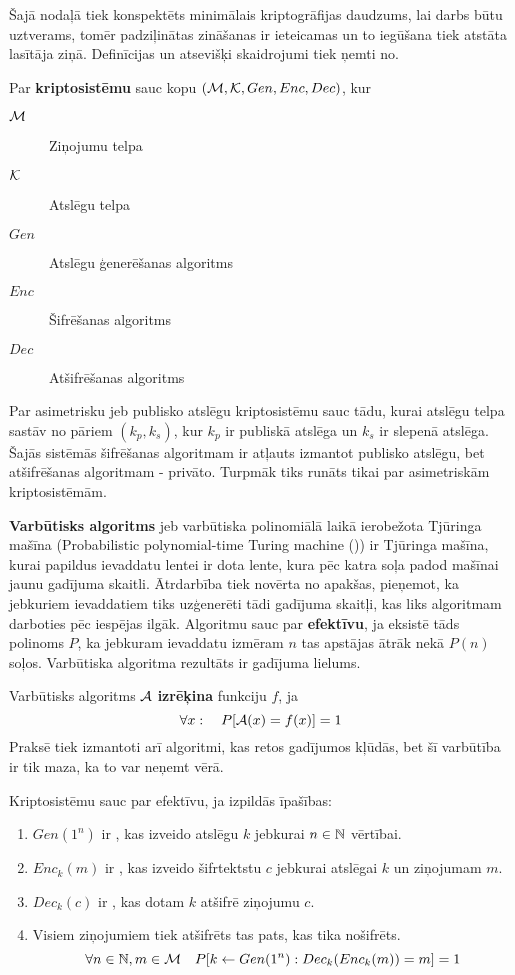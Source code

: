 Šajā nodaļā tiek konspektēts minimālais kriptogrāfijas daudzums, lai darbs būtu uztverams, tomēr padziļinātas zināšanas ir ieteicamas un to iegūšana tiek atstāta lasītāja ziņā. Definīcijas un atsevišķi skaidrojumi tiek ņemti no\cite{pass10}.

Par \textbf{kriptosistēmu} sauc kopu $(\mathcal{M}, \mathcal{K}, Gen, Enc, Dec)$, kur
\begin{description}
    \item[$\mathcal{M}$]Ziņojumu telpa
    \item[$\mathcal{K}$]Atslēgu telpa
    \item[$Gen$]Atslēgu ģenerēšanas algoritms
    \item[$Enc$]Šifrēšanas algoritms
    \item[$Dec$]Atšifrēšanas algoritms
\end{description}

Par asimetrisku jeb publisko atslēgu kriptosistēmu sauc tādu, kurai atslēgu telpa sastāv no pāriem $(k_p, k_s)$, kur $k_p$ ir publiskā atslēga un $k_s$ ir slepenā atslēga. Šajās sistēmās šifrēšanas algoritmam ir atļauts izmantot publisko atslēgu, bet atšifrēšanas algoritmam - privāto. Turpmāk tiks runāts tikai par asimetriskām kriptosistēmām.

\textbf{Varbūtisks algoritms} jeb varbūtiska polinomiālā laikā ierobežota Tjūringa mašīna (Probabilistic polynomial-time Turing machine (\ppt)) ir Tjūringa mašīna, kurai papildus ievaddatu lentei ir dota lente, kura pēc katra soļa padod mašīnai jaunu gadījuma skaitli. Ātrdarbība tiek novērta no apakšas, pieņemot, ka jebkuriem ievaddatiem tiks uzģenerēti tādi gadījuma skaitļi, kas liks algoritmam darboties pēc iespējas ilgāk. Algoritmu sauc par \textbf{efektīvu}, ja eksistē tāds polinoms $P$, ka jebkuram ievaddatu izmēram $n$ tas apstājas ātrāk nekā $P(n)$ soļos. Varbūtiska algoritma rezultāts ir gadījuma lielums.

Varbūtisks algoritms $\mathcal{A}$ \textbf{izrēķina} funkciju $f$, ja
$$ \forall x : \quad P[\mathcal{A}(x) = f(x)] = 1 $$
Praksē tiek izmantoti arī algoritmi, kas retos gadījumos kļūdās, bet šī varbūtība ir tik maza, ka to var neņemt vērā.

Kriptosistēmu sauc par efektīvu, ja izpildās īpašības:
\begin{enumerate}
    \item $Gen(1^n)$ ir \ppt, kas izveido atslēgu $k$ jebkurai $n\in\mathbb{N}$ vērtībai.
    \item $Enc_k(m)$ ir \ppt, kas izveido šifrtektstu $c$ jebkurai atslēgai $k$ un ziņojumam $m$.
    \item $Dec_k(c)$ ir \ppt, kas dotam $k$ atšifrē ziņojumu $c$.
    \item Visiem ziņojumiem tiek atšifrēts tas pats, kas tika nošifrēts.
        $$ \forall n\in\mathbb{N}, m\in\mathcal{M} \quad P[k\leftarrow Gen(1^n): Dec_k(Enc_k(m)) = m] = 1 $$
\end{enumerate}

